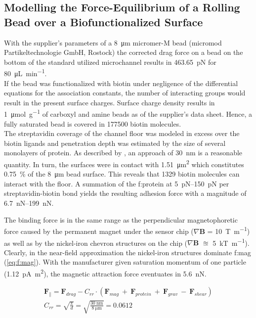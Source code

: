 \subsection{Modelling the Force-Equilibrium of a Rolling Bead over a Biofunctionalized Surface}
\label{sec:res:forcesim}
With the supplier's parameters of a \SI{8}{\micro\meter} micromer-M bead (micromod Partikeltechnologie GmbH, Rostock) the corrected drag force on a bead on the bottom of the standard utilized microchannel results in \SI{463.65}{\pico\newton} for \SI{80}{\micro\liter\per\minute}.\\
If the bead was functionalized with biotin under negligence of the differential equations for the association constants, the number of interacting groups would result in the present surface charges. Surface charge density results in \SI{1}{\micro\mole\per\gram} of \gls{carboxyl} and \gls{amine} beads as of the supplier's data sheet. Hence, a fully saturated bead is covered in \num{177500} biotin molecules.\\
The streptavidin coverage of the channel floor was modeled in excess over the biotin ligands and penetration depth was estimated by the size of several monolayers of protein. As described by \citet{lit:fluidic:ModelMIT}, an approach of \SI{30}{\nano\meter} is a reasonable quantity. In turn, the surfaces were in contact with \SI{1.51}{\micro\meter\squared} which constitutes \SI{0.75}{\percent} of the \SI{8}{\micro\meter} bead surface. This reveals that \num{1329} biotin molecules can interact with the floor. A summation of the \gls{f:protein} at \SIrange{5}{150}{\pico\newton} per streptavidin-biotin bond yields the resulting adhesion force with a magnitude of \SIrange{6.7}{199}{\nano\newton}.\cite{lit:bio:biotin:rupture} 

The binding force is in the same range as the perpendicular magnetophoretic force caused by the permanent magnet under the sensor chip ($\nabla \mathbf{B}$ = \SI{10}{\tesla\per\meter}) as well as by the nickel-iron chevron structures on the chip ($\nabla \mathbf{B}$ $\approxeq$ \SI{5}{\kilo\tesla\per\meter}). Clearly, in the near-field approximation the nickel-iron structures dominate \gls{f:mag} (\cref{eq:f:mag}). With the manufacturer given saturation momentum of one particle (\SI{1.12}{\pico\ampere\meter\squared}), the magnetic attraction force eventuates in \SI{5.6}{\nano\newton}.

\begin{align}
	\mathbf{F}_\parallel = \mathbf{F}_{drag} - C_{rr} \cdot (\mathbf{F}_{mag} \ +\ \mathbf{F}_{protein}  \ +\ \mathbf{F}_{grav}\ -\ \mathbf{F}_{shear} ) \label{eq:f:balance} \\
	C_{rr} = \sqrt{\frac{\text{z}}{d}} = \sqrt{\frac{\SI{30}{\nano\meter}}{\SI{8}{\micro\meter}}} = \num{0.0612} \label{eq:corr:roll}
\end{align}

